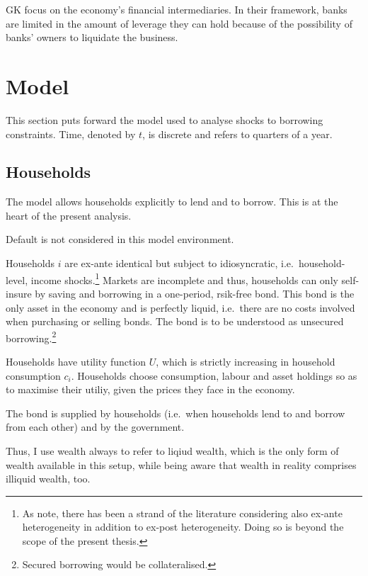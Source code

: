 \documentclass[12pt]{article} %
\numberwithin{equation}{section} %
\begin{document}
GK focus on the economy's financial intermediaries. In their framework, banks are limited in the amount of leverage they can hold because of the possibility of banks' owners to liquidate the business.

\section{Model}
\label{sec:model}

This section puts forward the model used to analyse shocks to borrowing constraints. Time, denoted by $t$, is discrete and refers to quarters of a year.

\subsection{Households}
\label{sec:model-hh}

The model allows households explicitly to lend and to borrow. This is at the heart of the present analysis.

Default is not considered in this model environment.

Households $i$ are ex-ante identical but subject to idiosyncratic, i.e.~household-level, income shocks.\footnote{As \textcite{cherrier2023} note, there has been a strand of the literature considering also ex-ante heterogeneity in addition to ex-post heterogeneity. Doing so is beyond the scope of the present thesis.} Markets are incomplete and thus, households can only self-insure by saving and borrowing in a one-period, rsik-free bond. This bond is the only asset in the economy and is perfectly liquid, i.e.~there are no costs involved when purchasing or selling bonds. The bond is to be understood as unsecured borrowing.\footnote{Secured borrowing would be collateralised.}

Households have utility function $U$, which is strictly increasing in household consumption $c_i$. Households choose consumption, labour and asset holdings so as to maximise their utiliy, given the prices they face in the economy.

The bond is supplied by households (i.e.~when households lend to and borrow from each other) and by the government. %

Thus, I use wealth always to refer to liqiud wealth, which is the only form of wealth available in this setup, while being aware that wealth in reality comprises illiquid wealth, too.
\end{document}

